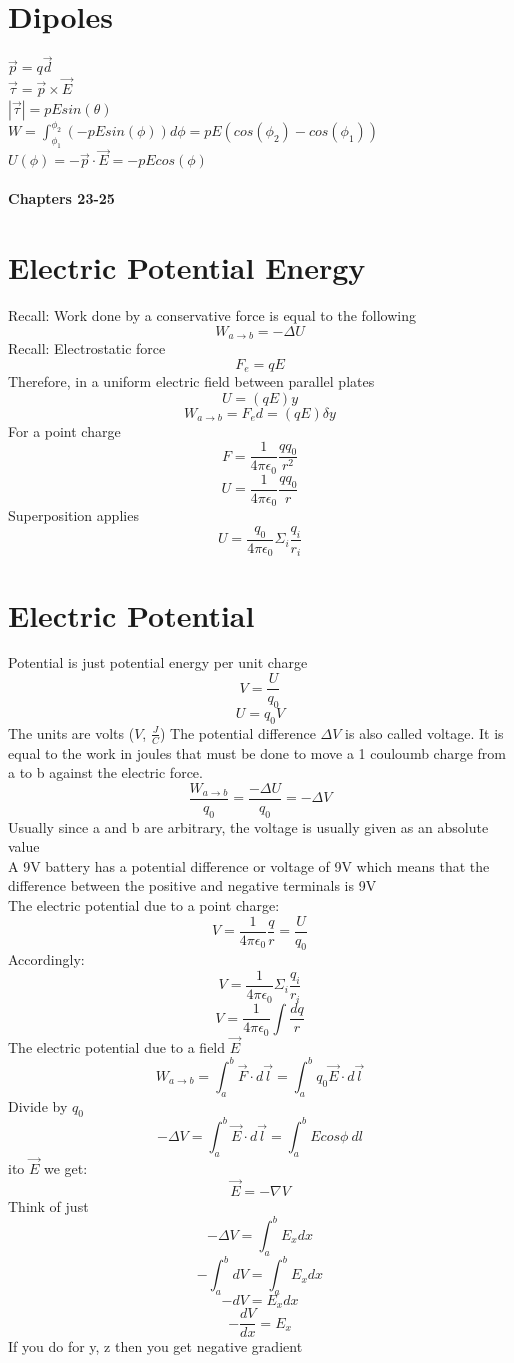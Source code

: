 \documentclass[10pt, a4paper, twocolumn]{article}
\begin{document}
    \section{Dipoles}    
    $\vec{p} = q \vec{d}$\\
    $\vec{\tau} = \vec{p} \times \vec{E}$\\
    $|\vec{\tau}| = pEsin(\theta)$\\
    $W = \int^{\phi_2}_{\phi_1} (-pEsin(\phi))d\phi = pE(cos(\phi_2) - cos(\phi_1))$
    $U(\phi) = -\vec{p} \cdot \vec{E} = -pEcos(\phi)$\\ \\

\textbf{\huge Chapters 23-25}
    \section{Electric Potential Energy}	
        Recall: Work done by a conservative force is equal to the following
        $$W_{a\rightarrow b} = -\Delta U$$
        Recall: Electrostatic force
        $$F_e = qE$$
        Therefore, in a uniform electric field between parallel plates
        $$U = (qE)y$$
        $$W_{a \rightarrow b} = F_e d = (qE)\delta y$$
        For a point charge
        $$F = \frac{1}{4 \pi \epsilon_0} \frac{q q_0}{r^2}$$
        $$U = \frac{1}{4 \pi \epsilon_0} \frac{q q_0}{r}$$
        Superposition applies
        $$U = \frac{q_0}{4 \pi \epsilon_0} \Sigma_{i} \frac{q_i}{r_i}$$

    \section{Electric Potential}	
        Potential is just potential energy per unit charge
        $$V = \frac{U}{q_0}$$
        $$U = q_0 V$$
        The units are volts ($V$, $\frac{J}{C}$)
        The potential difference $\Delta V$ is also called voltage. It is equal to the work in joules that must be done to move a 1 couloumb charge from a to b against the electric force.
        $$\frac{W_{a \rightarrow b}}{q_0} = \frac{-\Delta U}{q_0} = -\Delta V$$
        Usually since a and b are arbitrary, the voltage is usually given as an absolute value\\
        A 9V battery has a potential difference or voltage of 9V which means that the difference between the positive and negative terminals is 9V\\
        The electric potential due to a point charge:
        $$V = \frac{1}{4 \pi \epsilon_0} \frac{q}{r} = \frac{U}{q_0}$$
        Accordingly:
        $$V = \frac{1}{4 \pi \epsilon_0} \Sigma_{i} \frac{q_i}{r_i}$$
        $$V = \frac{1}{4 \pi \epsilon_0} \int \frac{dq}{r}$$
        The electric potential due to a field $\vec{E}$
        $$W_{a \rightarrow b} = \int^{b}_{a} \vec{F} \cdot d \vec{l} = \int^{b}_{a} q_0 \vec{E} \cdot d \vec{l}  $$
        Divide by $q_0$
        $$-\Delta V = \int^{b}_{a} \vec{E} \cdot d \vec{l} = \int^{b}_{a} Ecos\phi\ dl  $$
        ito $\vec{E}$ we get:
        $$\vec{E} = -\nabla V$$
        Think of just
        $$-\Delta V = \int^{b}_{a} E_x dx$$
        $$-\int^{b}_{a} dV = \int^{b}_{a} E_x dx$$
        $$-dV = E_x dx$$
        $$-\frac{dV}{dx} = E_x$$
        If you do for y, z then you get negative gradient
\end{document}
